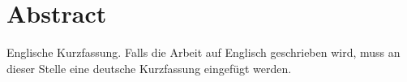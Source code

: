 \documentclass[12pt,a4paper,twoside]{book}
\newcounter{NstopRoman}
\begin{document}
	\par


	\clearemptydoublepage
	\section*{Abstract}
	Englische Kurzfassung. Falls die Arbeit auf Englisch geschrieben wird, muss an dieser Stelle eine deutsche Kurzfassung eingefügt werden.\par

	
	\clearemptydoublepage
	\tableofcontents
	\clearemptydoublepage

	\clearemptydoublepage
	

	\clearemptydoublepage
	
	\setcounter{NstopRoman}{\value{page}}
	

	\clearemptydoublepage
	\mainmatter				%
	\tikzexternalenable
	\pagestyle{hauptteil}

	\clearemptydoublepage
	
	\clearemptydoublepage
	
	\clearemptydoublepage
	
	\clearemptydoublepage
	
	\clearemptydoublepage
	
	\clearemptydoublepage
	


	\clearemptydoublepage
	

	\newpage
	\clearemptydoublepage
	
\backmatter
\end{document}
